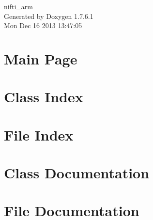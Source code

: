 \documentclass[a4paper]{book}
\begin{document}
\begin{titlepage}
\vspace*{7cm}
\begin{center}
{\Large nifti\-\_\-arm }\\
\vspace*{1cm}
{\large \-Generated by Doxygen 1.7.6.1}\\
\vspace*{0.5cm}
{\small Mon Dec 16 2013 13:47:05}\\
\end{center}
\end{titlepage}
\clearemptydoublepage
{}
\tableofcontents
\clearemptydoublepage
{}
\chapter{\-Main \-Page}
\label{index}
\chapter{\-Class \-Index}

\chapter{\-File \-Index}

\chapter{\-Class \-Documentation}




\chapter{\-File \-Documentation}













\printindex
\end{document}
